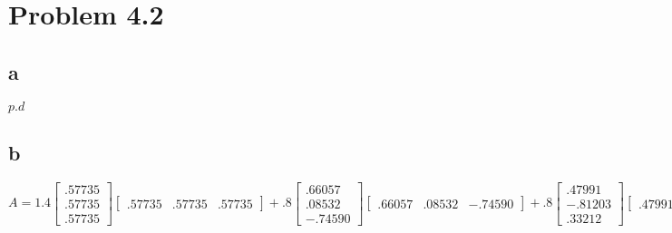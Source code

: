 \documentclass{article}
\begin{document}
\section*{Problem 4.2}
\subsection*{a}
$p.d$

\subsection*{b}
$A = 1.4
\begin{bmatrix}
  .57735 \\
  .57735 \\
  .57735
\end{bmatrix}
\begin{bmatrix}
  .57735 & .57735 & .57735
\end{bmatrix}
+.8
\begin{bmatrix}
  .66057 \\
  .08532 \\
  -.74590
\end{bmatrix}
\begin{bmatrix}
  .66057 & .08532 & -.74590
\end{bmatrix}
+.8
\begin{bmatrix}
  .47991 \\
  -.81203 \\
  .33212
\end{bmatrix}
\begin{bmatrix}
  .47991 & -.81203 & .33212
\end{bmatrix}
$
\end{document}
